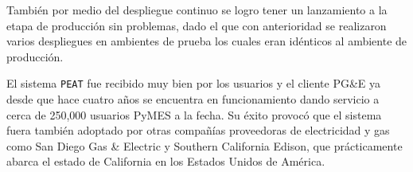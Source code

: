 También por medio del despliegue continuo se logro tener un lanzamiento a la etapa
de producción sin problemas, dado el que con anterioridad se realizaron varios
despliegues en ambientes de prueba los cuales eran idénticos al ambiente de
producción.

\pagebreak

El sistema \texttt{PEAT} fue recibido muy bien por los usuarios y el cliente PG\&E
ya desde que hace cuatro años se encuentra en funcionamiento dando servicio a cerca
de 250,000 usuarios PyMES a la fecha\cite{30_pge_annual_report}. Su éxito provocó que
el sistema fuera también adoptado por otras compañías proveedoras de electricidad y
gas como San Diego Gas \& Electric\cite{32_reuters_c3} y Southern California Edison,
que prácticamente abarca el estado de California en los Estados Unidos de
América\cite{31_energy_map}.

